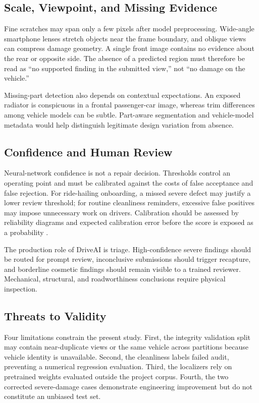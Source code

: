 \documentclass[conference]{IEEEtran}
\begin{document}
\subsection{Scale, Viewpoint, and Missing Evidence}

Fine scratches may span only a few pixels after model preprocessing. Wide-angle smartphone lenses stretch objects near the frame boundary, and oblique views can compress damage geometry. A single front image contains no evidence about the rear or opposite side. The absence of a predicted region must therefore be read as ``no supported finding in the submitted view,'' not ``no damage on the vehicle.''

Missing-part detection also depends on contextual expectations. An exposed radiator is conspicuous in a frontal passenger-car image, whereas trim differences among vehicle models can be subtle. Part-aware segmentation and vehicle-model metadata would help distinguish legitimate design variation from absence.

\subsection{Confidence and Human Review}

Neural-network confidence is not a repair decision. Thresholds control an operating point and must be calibrated against the costs of false acceptance and false rejection. For ride-hailing onboarding, a missed severe defect may justify a lower review threshold; for routine cleanliness reminders, excessive false positives may impose unnecessary work on drivers. Calibration should be assessed by reliability diagrams and expected calibration error before the score is exposed as a probability \cite{guo2017calibration}.

The production role of DriveAI is triage. High-confidence severe findings should be routed for prompt review, inconclusive submissions should trigger recapture, and borderline cosmetic findings should remain visible to a trained reviewer. Mechanical, structural, and roadworthiness conclusions require physical inspection.

\subsection{Threats to Validity}

Four limitations constrain the present study. First, the integrity validation split may contain near-duplicate views or the same vehicle across partitions because vehicle identity is unavailable. Second, the cleanliness labels failed audit, preventing a numerical regression evaluation. Third, the localizers rely on pretrained weights evaluated outside the project corpus. Fourth, the two corrected severe-damage cases demonstrate engineering improvement but do not constitute an unbiased test set.
\end{document}
